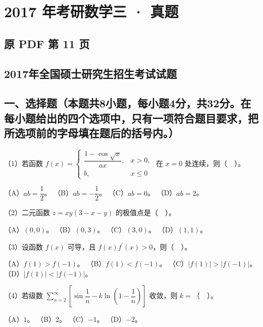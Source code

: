 \documentclass[UTF8,12pt]{ctexart}
\begin{document}
\section*{2017 年考研数学三 · 真题}
\subsection*{原 PDF 第 11 页}

\subsection*{2017年全国硕士研究生招生考试试题}

\subsection*{一、选择题（本题共8小题，每小题4分，共32分。在每小题给出的四个选项中，只有一项符合题目要求，把所选项前的字母填在题后的括号内。）}

（1）若函数 \(\displaystyle f(x)=\begin{cases}\dfrac{\displaystyle 1-\cos\sqrt{x}}{\displaystyle ax},\allowbreak &x>0,\allowbreak \\b,\allowbreak &x\le0\end{cases}\) 在 \(\displaystyle x=0\) 处连续，则（　）。


（A）\(\displaystyle ab=\dfrac{\displaystyle 1}{\displaystyle 2}\)。 （B）\(\displaystyle ab=-\dfrac{\displaystyle 1}{\displaystyle 2}\)。 （C）\(\displaystyle ab=0\)。 （D）\(\displaystyle ab=2\)。


（2）二元函数 \(\displaystyle z=xy(3-x-y)\) 的极值点是（　）。


（A）\(\displaystyle (0,\allowbreak 0)\)。 （B）\(\displaystyle (0,\allowbreak 3)\)。 （C）\(\displaystyle (3,\allowbreak 0)\)。 （D）\(\displaystyle (1,\allowbreak 1)\)。


（3）设函数 \(\displaystyle f(x)\) 可导，且 \(\displaystyle f(x)f^{\prime}(x)>0\)，则（　）。


（A）\(\displaystyle f(1)>f(-1)\)。 （B）\(\displaystyle f(1)<f(-1)\)。 （C）\(\displaystyle |f(1)|>|f(-1)|\)。 （D）\(\displaystyle |f(1)|<|f(-1)|\)。


（4）若级数 \(\displaystyle \sum_{n=2}^{\infty}[\sin\dfrac{\displaystyle 1}{\displaystyle n}-k\ln(1-\dfrac{\displaystyle 1}{\displaystyle n})]\) 收敛，则 \(\displaystyle k=\)（　）。


（A）\(\displaystyle 1\)。 （B）\(\displaystyle 2\)。 （C）\(\displaystyle -1\)。 （D）\(\displaystyle -2\)。
\end{document}
